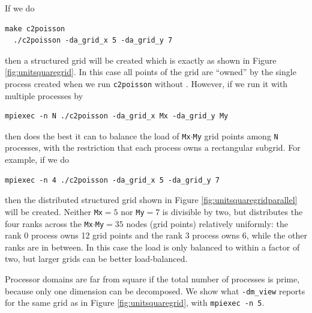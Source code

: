 If we do
\begin{Verbatim}[fontsize=\small]
  make c2poisson
  ./c2poisson -da_grid_x 5 -da_grid_y 7
\end{Verbatim}
then a structured grid will be created which is exactly as shown in Figure \ref{fig:unitsquaregrid}.  In this case all points of the grid are ``owned'' by the single process created when we run \texttt{c2poisson} without \MPI.  However, if we run it with multiple \MPI processes by
\begin{Verbatim}[fontsize=\small]
  mpiexec -n N ./c2poisson -da_grid_x Mx -da_grid_y My
\end{Verbatim}
then \PETSc does the best it can to balance the load of \texttt{Mx}$\cdot$\texttt{My} grid points among \texttt{N} processes, with the restriction that each \MPI process owns a rectangular subgrid.  For example, if we do
\begin{Verbatim}[fontsize=\small]
  mpiexec -n 4 ./c2poisson -da_grid_x 5 -da_grid_y 7
\end{Verbatim}
then the distributed structured grid shown in Figure \ref{fig:unitsquaregridparallel} will be created.  Neither \texttt{Mx}$=5$ nor \texttt{My}$=7$ is divisible by two, but \PETSc distributes the four ranks across the \texttt{Mx}$\cdot$\texttt{My}$=35$ nodes (grid points) relatively uniformly: the rank $0$ process owns 12 grid points and the rank $3$ process owns 6, while the other ranks are in between.  In this case the load is only balanced to within a factor of two, but larger grids can be better load-balanced.  

\begin{marginfigure}
\caption{Processor domains are far from square if the total number of \MPI processes is prime, because only one dimension can be decomposed.  We show what \texttt{-dm\_view} reports for the same grid as in Figure \ref{fig:unitsquaregrid}, with \texttt{mpiexec -n 5}.}
\label{fig:unitsquaregridprime}
\end{marginfigure}

